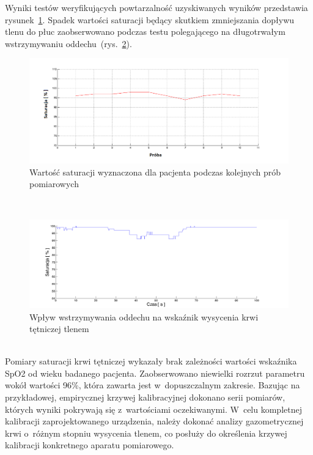 \noindent Wyniki testów weryfikujących powtarzalność uzyskiwanych wyników przedstawia rysunek~\ref{rys:SatProba}. Spadek wartości
saturacji będący skutkiem zmniejszania dopływu tlenu do płuc zaobserwowano podczas testu polegającego na długotrwałym wstrzymywaniu
oddechu~(rys.~\ref{rys:spadek}).
\begin{figure}[!ht]
	\centerline{\includegraphics[scale = 0.58]{graphic/SatProba}}
	\caption{Wartość saturacji wyznaczona dla pacjenta podczas kolejnych prób pomiarowych}
	\label{rys:SatProba}
\end{figure}\\
\begin{figure}[!ht]
	\centerline{\includegraphics[scale = 0.38]{graphic/spadek}}
	\caption{Wpływ wstrzymywania oddechu na wskaźnik wysycenia krwi tętniczej tlenem}
	\label{rys:spadek}
\end{figure}\\

Pomiary saturacji krwi tętniczej wykazały brak zależności wartości wskaźnika SpO2 od wieku badanego pacjenta. Zaobserwowano
niewielki rozrzut parametru wokół wartości 96\%, która zawarta jest w~dopuszczalnym zakresie.   
\noindent Bazując na przykładowej, empirycznej krzywej kalibracyjnej dokonano serii pomiarów, których wyniki pokrywają się
z~wartościami oczekiwanymi. W~celu kompletnej kalibracji zaprojektowanego urządzenia, należy dokonać
analizy gazometrycznej krwi o~różnym stopniu wysycenia tlenem, co posłuży do określenia krzywej kalibracji konkretnego 
aparatu pomiarowego. 
